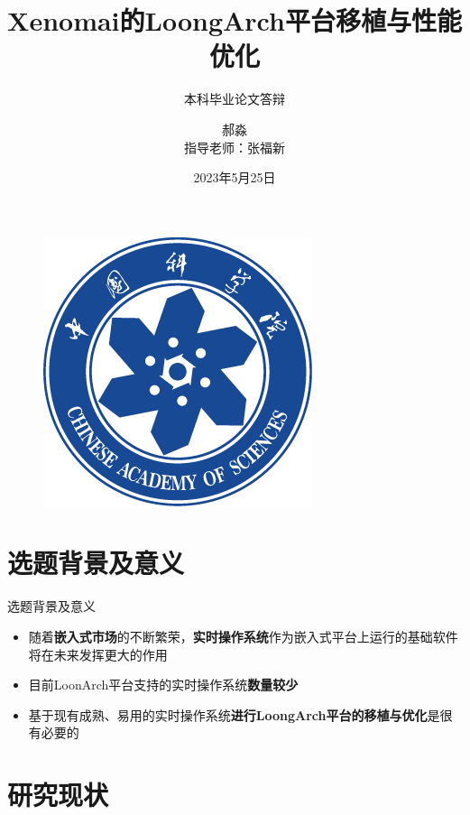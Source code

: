 \documentclass{beamer}
\author[郝淼]{郝淼\\{指导老师：张福新}}
\title{Xenomai的LoongArch平台移植与性能优化}
\subtitle{本科毕业论文答辩}
\institute{中国科学院大学计算机科学与技术学院}
\date{2023年5月25日}
\begin{document}
\heiti
\begin{frame}
    \titlepage
    \begin{figure}[htpb]
        \begin{center}
            \includegraphics[width=0.2\linewidth]{pic/CAS_Logo.png}
        \end{center}
    \end{figure}
\end{frame}

\begin{frame}
    \tableofcontents[sectionstyle=show,subsectionstyle=show/shaded/hide,subsubsectionstyle=show/shaded/hide]
\end{frame}

\section{选题背景及意义}


\begin{frame}{选题背景及意义}
    \begin{itemize}
        \item 随着\textbf{嵌入式市场}的不断繁荣，\textbf{实时操作系统}作为嵌入式平台上运行的基础软件将在未来发挥更大的作用
        \item 目前LoonArch平台支持的实时操作系统\textbf{数量较少}
        \item 基于现有成熟、易用的实时操作系统\textbf{进行LoongArch平台的移植与优化}是很有必要的
    \end{itemize}
\end{frame}

\section{研究现状}
\end{document}
